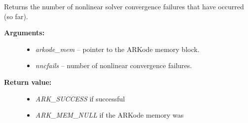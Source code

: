 \documentclass[letterpaper,10pt,english]{sphinxmanual}
\begin{document}
\begin{fulllineitems}
\label{c_interface/User_callable:c.ARKodeGetNumNonlinSolvConvFails}
Returns the number of nonlinear solver convergence
failures that have occurred (so far).
\begin{description}
\item[{\textbf{Arguments:}}] \leavevmode\begin{itemize}
\item {} 
\emph{arkode\_mem} -- pointer to the ARKode memory block.

\item {} 
\emph{nncfails} -- number of nonlinear convergence failures.

\end{itemize}

\item[{\textbf{Return value:}}] \leavevmode\begin{itemize}
\item {} 
\emph{ARK\_SUCCESS} if successful

\item {} 
\emph{ARK\_MEM\_NULL} if the ARKode memory was 

\end{itemize}

\end{description}

\end{fulllineitems}

\end{document}
